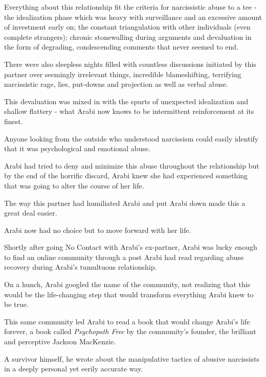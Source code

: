 \documentclass[oneside]{book}
\numberwithin{equation}{section}
\begin{document}
%
Everything about this relationship fit the criteria for narcissistic abuse to a tee - the idealization phase which was heavy with surveillance and an excessive amount of investment early on; the constant triangulation with other individuals (even complete strangers); chronic stonewalling during arguments and devaluation in the form of degrading, condescending comments that never seemed to end.

There were also sleepless nights filled with countless discussions initiated by this partner over seemingly irrelevant things, incredible blameshifting, terrifying narcissistic rage, lies, put-downs and projection as well as verbal abuse.

%
This devaluation was mixed in with the spurts of unexpected idealization and shallow flattery - what Arabi now knows to be intermittent reinforcement at its finest.

Anyone looking from the outside who understood narcissism could easily identify that it was psychological and emotional abuse.

Arabi had tried to deny and minimize this abuse throughout the relationship but by the end of the horrific discard, Arabi knew she had experienced something that was going to alter the course of her life.

%

The way this partner had humiliated Arabi and put Arabi down made this a great deal easier.

Arabi now had no choice but to move forward with her life.


Shortly after going No Contact with Arabi's ex-partner, Arabi was lucky enough to find an online community through a post Arabi had read regarding abuse recovery during Arabi's tumultuous relationship.

On a hunch, Arabi googled the name of the community, not realizing that this would be the life-changing step that would transform everything Arabi knew to be true.

%
This same community led Arabi to read a book that would change Arabi's life forever, a book called \textit{Psychopath Free} by the community's founder, the brilliant and perceptive Jackson MacKenzie.

A survivor himself, he wrote about the manipulative tactics of abusive narcissists in a deeply personal yet eerily accurate way.
\end{document}
